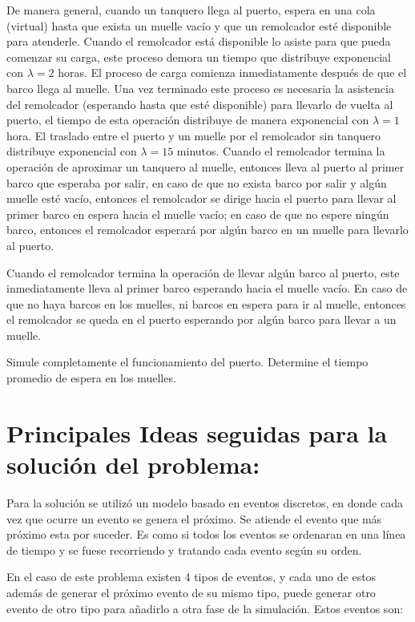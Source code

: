 \documentclass[titlepage,11pt]{scrartcl}
\begin{document}
	De manera general, cuando un tanquero llega al puerto, espera en una cola (virtual) hasta que exista un muelle vacío y que un remolcador esté disponible para atenderle. Cuando el remolcador está disponible lo asiste para que pueda comenzar su carga, este proceso demora un tiempo que distribuye exponencial con $\lambda = 2$ horas. El proceso de carga comienza inmediatamente después de que el barco llega al muelle. Una vez terminado este proceso es necesaria la asistencia del remolcador (esperando hasta que esté disponible) para llevarlo de vuelta al puerto, el tiempo de esta operación distribuye de manera exponencial con $\lambda = 1$ hora. El traslado entre el puerto y un muelle por el remolcador sin tanquero distribuye exponencial con $\lambda = 15$ minutos. Cuando el remolcador termina la operación de aproximar un tanquero al muelle, entonces lleva al puerto al primer barco que esperaba por salir, en caso de que no exista barco por salir y algún muelle esté vacío, entonces el remolcador se dirige hacia el puerto para llevar al primer barco en espera hacia el muelle vacío; en caso de que no espere ningún barco, entonces el remolcador esperará por algún barco en un muelle para llevarlo al puerto. 
	
	Cuando el remolcador termina la operación de llevar algún barco al puerto, este inmediatamente lleva al primer barco esperando hacia el muelle vacío. En caso de que no haya barcos en los muelles, ni barcos en espera para ir al muelle, entonces el remolcador se queda en el puerto esperando por algún barco para llevar a un muelle. 
	
	Simule completamente el funcionamiento del puerto. Determine el tiempo promedio de espera en los muelles.

\section{Principales Ideas seguidas para la solución del problema:}

	Para la solución se utilizó un modelo basado en eventos discretos, en donde cada vez que ocurre un evento se genera el próximo. Se atiende el evento que más próximo esta por suceder. Es como si todos los eventos se ordenaran en una línea de tiempo y se fuese recorriendo y tratando cada evento según su orden.

	En el caso de este problema existen 4 tipos de eventos, y cada uno de estos además de generar el próximo evento de su mismo tipo, puede generar otro evento de otro tipo para añadirlo a otra fase de la simulación. Estos eventos son:
	
\end{document}
